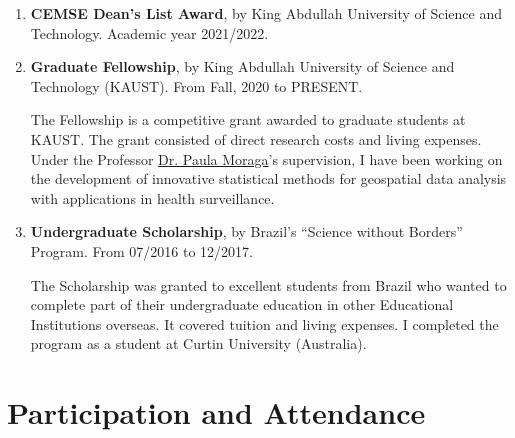 \documentclass[10pt, ]{article}
\begin{document}
	\begin{enumerate}[noitemsep, topsep=0pt]
		\item \textbf{CEMSE Dean's List Award}, by King Abdullah University of Science and Technology. Academic year 2021/2022.
		
		\item \textbf{Graduate Fellowship}, by King Abdullah University of Science and Technology (KAUST). From Fall, 2020 to PRESENT. \vspace{3pt}
		
		The Fellowship is a competitive grant awarded to graduate students at KAUST. The grant consisted of direct research costs and living expenses. Under the Professor \href{https://www.paulamoraga.com/}{Dr. Paula Moraga}'s supervision, I have been working on the development of innovative statistical methods for geospatial data analysis with applications in health surveillance. \vspace{3pt}
		
		\item \textbf{Undergraduate Scholarship}, by Brazil's ``Science without Borders'' Program. From 07/2016 to 12/2017.\vspace{3pt}
		
		The Scholarship was granted to excellent students from Brazil who wanted to complete part of their undergraduate education in other Educational Institutions overseas. It covered tuition and living expenses. I completed the program as a student at Curtin University (Australia).
		
	\end{enumerate}
	
	\vspace{10pt}
	
	\vspace{-12pt}
	\section*{Participation and Attendance} \vspace{-5pt}
	
\end{document}

